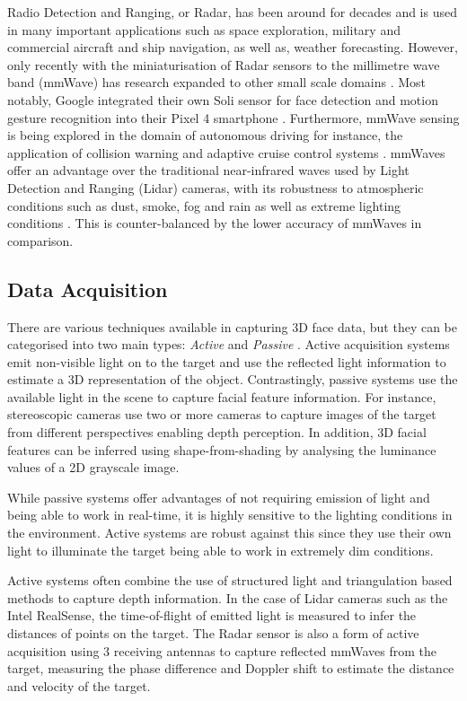 \documentclass{interim}
\begin{document}
Radio Detection and Ranging, or Radar, has been around for decades and is used in many important applications such as space exploration, military and commercial aircraft and ship navigation, as well as, weather forecasting. However, only recently with the miniaturisation of Radar sensors to the millimetre wave band (mmWave) has research expanded to other small scale domains \cite{soumya2023recent}. Most notably, Google integrated their own Soli sensor for face detection and motion gesture recognition into their Pixel 4 smartphone \cite{googleblog2020}. Furthermore, mmWave sensing is being explored in the domain of autonomous driving for instance, the application of collision warning and adaptive cruise control systems \cite{dfrobot}. mmWaves offer an advantage over the traditional near-infrared waves used by Light Detection and Ranging (Lidar) cameras, with its robustness to atmospheric conditions such as dust, smoke, fog and rain as well as extreme lighting conditions \cite{cadenceblog2022}. This is counter-balanced by the lower accuracy of mmWaves in comparison.


\subsection{Data Acquisition}
There are various techniques available in capturing 3D face data, but they can be categorised into two main types: \textit{Active} and \textit{Passive} \cite{zhou20183d}. Active acquisition systems emit non-visible light on to the target and use the reflected light information to estimate a 3D representation of the object. Contrastingly, passive systems use the available light in the scene to capture facial feature information. For instance, stereoscopic cameras use two or more cameras to capture images of the target from different perspectives enabling depth perception. In addition, 3D facial features can be inferred using shape-from-shading by analysing the luminance values of a 2D grayscale image. 

While passive systems offer advantages of not requiring emission of light and being able to work in real-time, it is highly sensitive to the lighting conditions in the environment. Active systems are robust against this since they use their own light to illuminate the target being able to work in extremely dim conditions. 

Active systems often combine the use of structured light and triangulation based methods to capture depth information. In the case of Lidar cameras such as the Intel RealSense, the time-of-flight of emitted light is measured to infer the distances of points on the target. The Radar sensor is also a form of active acquisition using 3 receiving antennas to capture reflected mmWaves from the target, measuring the phase difference and Doppler shift to estimate the distance and velocity of the target. 
\end{document}
